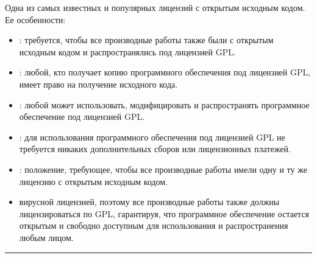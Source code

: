 \documentclass[letterpaper,10pt,russian]{sphinxmanual}
\begin{document}
\sphinxAtStartPar
{} Одна из самых известных и популярных лицензий с открытым исходным кодом. Ее особенности:
\begin{itemize}
\item {} 
\sphinxAtStartPar
{}: требуется, чтобы все производные работы также были с открытым исходным кодом и распространялись под лицензией GPL.

\item {} 
\sphinxAtStartPar
{}: любой, кто получает копию программного обеспечения под лицензией GPL, имеет право на получение исходного кода.

\item {} 
\sphinxAtStartPar
{}: любой может использовать, модифицировать и распространять программное обеспечение под лицензией GPL.

\item {} 
\sphinxAtStartPar
{}: для использования программного обеспечения под лицензией GPL не требуется никаких дополнительных сборов или лицензионных платежей.

\item {} 
\sphinxAtStartPar
{}: положение, требующее, чтобы все производные работы имели одну и ту же лицензию с открытым исходным кодом.

\item {} 
\sphinxAtStartPar
{} вирусной лицензией, поэтому все производные работы также должны лицензироваться по GPL, гарантируя, что программное обеспечение остается открытым и свободно доступным для использования и распространения любым лицом.

\end{itemize}


\bigskip\hrule\bigskip
\end{document}
